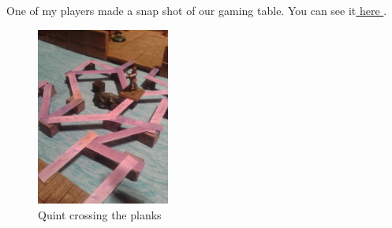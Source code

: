 One of my players made a snap shot of our gaming table. You can see it\hyperref[fig:Quint-crossing-the-planks-409036840]{ here } . \\

\begin{figure}[h]
	\centering
	\includegraphics[width=0.39\textwidth]{images/Quint-crossing-the-planks-409036840.jpg}
	\caption{Quint crossing the planks}
	\label{fig:Quint-crossing-the-planks-409036840}
\end{figure}

